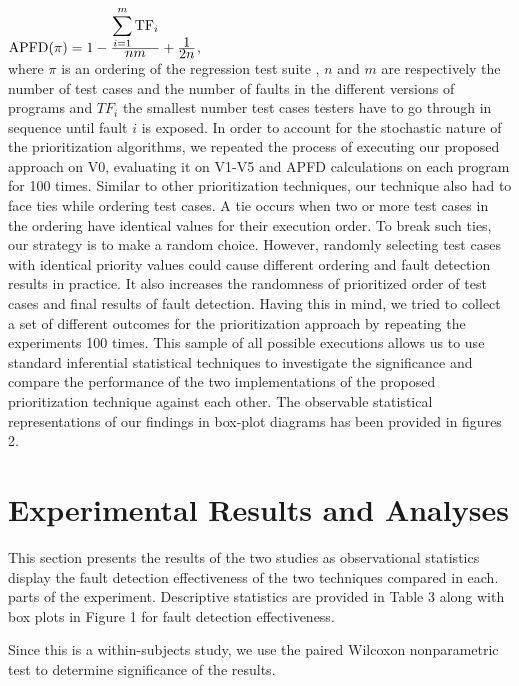 \documentclass{sig-alternate}
\begin{document}
$\textnormal{APFD}(\pi) = 1 - \frac{ \displaystyle \sum_{i=1}^{m}\textnormal{TF}_i }{\displaystyle nm} + \frac{\displaystyle 1}{\displaystyle 2n}$,    \\

where $\pi$ is an ordering of the regression test suite \cite{henard:comparing}, $n$ and $m$
are respectively the number of test cases and the number of faults in the different versions of programs and $TF_i$ the smallest number test cases testers have to go through in sequence until fault $i$ is exposed. 
In order to account for the stochastic nature of the prioritization algorithms, we repeated the process of executing our proposed approach on V0, evaluating it on V1-V5 and APFD calculations on each program for 100 times. Similar to other prioritization techniques, our technique also had to face ties while ordering test cases. A tie occurs when two or more test cases in the ordering have identical values for their execution order. To break such ties, our strategy is to make a random choice. However, randomly selecting test cases with identical priority values could cause different ordering and fault detection results in practice. It also increases the randomness of prioritized order of test cases and final results of fault detection. Having this in mind, we tried to collect a set of different outcomes for the prioritization approach by repeating the experiments 100 times. This sample of all possible executions allows us to use standard inferential statistical techniques to investigate the significance and compare the performance of the two implementations of the proposed prioritization technique against each other. The observable statistical representations of our findings in box-plot diagrams has been provided in figures 2. 

\section{Experimental Results and Analyses}
This section presents the results of the two studies as observational statistics display the fault detection effectiveness of the two techniques compared in each. parts of the experiment. Descriptive statistics are provided in Table 3 along with box plots in Figure 1 for fault detection effectiveness. 
\begin{comment}
We report on the effect of layout on accuracy and speed in all task categories as
well as in each of the six task categories. Effect size is
also reported using Cohen's d for accuracy and speed to
facilitate easy comparison to other studies. 
\end{comment}
Since this is a within-subjects study, we use the paired Wilcoxon nonparametric
test to determine significance of the results.
\end{document}
